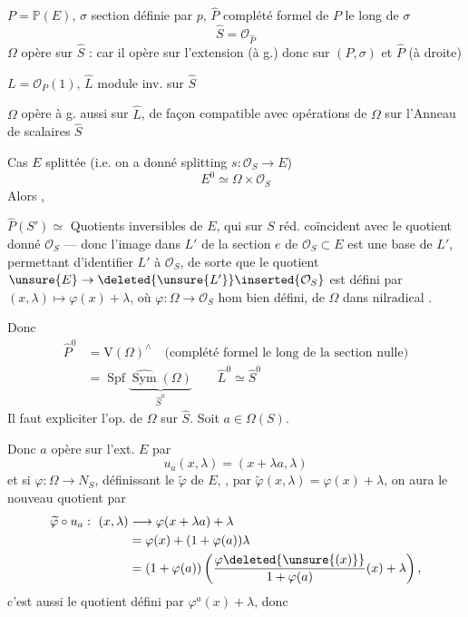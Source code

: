 
$P=\mathbb{P}(E)$, $\sigma$ section définie par $p$, $\widehat P$ complété formel de $P$ le long de $\sigma$
\[
\widehat S=\mathcal{O}_{\widehat P}
\]
$\Omega$ opère  sur $\widehat S$ : car il opère sur l'extension (à g.) donc sur $(P,\sigma)$ et $\widehat P$ (à droite)

$L=\mathcal{O}_P(1)$, $\widehat L$ module inv. sur $\widehat S$

$\Omega$ opère à g. aussi sur $\widehat L$, de façon compatible avec opérations de $\Omega$ sur l'Anneau de scalaires $\widehat S$

Cas $E$  splittée (i.e. on a donné splitting $s:\mathcal{O}_S\to E$)
\[
E^0\simeq\Omega\times\mathcal{O}_S
\]
Alors ,

 $\widehat P(S')\simeq$ Quotients inversibles  de $E$, qui sur $S$ réd. coïncident avec le quotient donné $\mathcal{O}_S$ --- donc l'image dans $L'$ de la section $e$ de $\mathcal{O}_S\subset E$ est une base de $L'$, permettant d'identifier $L'$ à $\mathcal{O}_S$, de sorte que le quotient $\unsure{E}\to\deleted{\unsure{L'}}\inserted{\mathcal{O}_S}$ est défini par $(x,\lambda)\longmapsto\varphi(x)+\lambda$, où $\varphi:\Omega\to\mathcal{O}_S$ hom bien défini, de $\Omega$ dans nilradical .

Donc
\[
\begin{aligned}
\widehat P^0&=\mathrm{V}(\Omega)^\wedge\quad\text{(complété formel le long de la section nulle)}\\
&=\operatorname{Spf}\underbrace{\widehat{\operatorname{Sym}}(\Omega)}_{\widehat S^0}
\qquad \widehat L^0\simeq\widehat S^0
\end{aligned}
\]
Il faut expliciter l'op. de $\Omega$ sur $\widehat S$. Soit $a\in\Omega(S)$.

Donc $a$ opère sur l'ext. $E$ par
\[
u_a(x,\lambda)=(x+\lambda a,\lambda)
\]
et si  $\varphi:\Omega\to N_S$, définissant le  $\widetilde\varphi$ de $E$, , par $\widetilde\varphi(x,\lambda)=\varphi(x)+\lambda$, on aura le nouveau quotient par
\[
\begin{aligned}
\widetilde\varphi\circ u_a:\ (x,\lambda)&\longrightarrow\varphi(x+\lambda a)+\lambda\\
&=\varphi(x)+(1+\varphi(a))\lambda\\
&=(1+\varphi(a))\left(\frac{\varphi\deleted{\unsure{(x)}}}{1+\varphi(a)}(x)+\lambda\right),
\end{aligned}
\]
c'est aussi le quotient défini par  $\varphi^a(x)+\lambda$, donc
